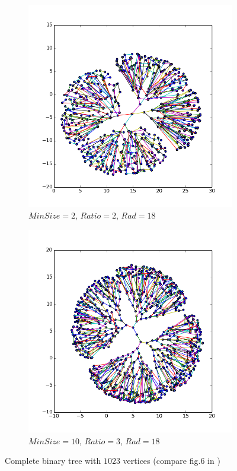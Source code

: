 \documentclass[12pt,a4paper]{article}
\begin{document}
\begin{figure}[hb]
	 \begin{subfigure}{0.5\textwidth}
		   \centering
           \includegraphics[scale=0.44]{results_Harel/HK_btree1023_m2_r2_rad18.png}
           \caption{$MinSize=2$, $Ratio=2$, $Rad =18$}
     \end{subfigure}
	 \begin{subfigure}{0.5\textwidth}
			\centering
           \includegraphics[scale=0.44]{results_Harel/HK_btree1023_m10_r3_rad18.png}
            \caption{$MinSize=10$, $Ratio=3$, $Rad =18$}
     \end{subfigure}
     \caption{Complete binary tree with $1023$ vertices (compare fig.$6$ in \cite{DavidHarel2002})}
     \label{fig: btrees}
\end{figure}     
\end{document}
